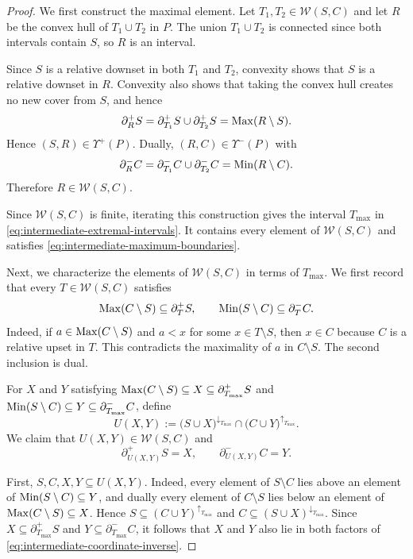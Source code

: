\begin{proof}
We first construct the maximal element.  Let
$T_1,T_2\in\mathcal W(S,C)$ and let $R$ be the convex hull of
$T_1\cup T_2$ in $P$.
The union $T_1\cup T_2$ is connected since both intervals contain
$S$, so $R$ is an interval.

Since $S$ is a relative downset in both $T_1$ and $T_2$, convexity
shows that $S$ is a relative downset in $R$.  Convexity also shows
that taking the convex hull creates no new cover from $S$, and hence
\[
\partial_R^+S
=
\partial_{T_1}^+S\cup\partial_{T_2}^+S
=
\operatorname{Max}(R\setminus S).
\]
Hence $(S,R)\in\Upsilon^+(P)$.
Dually, $(R,C)\in\Upsilon^-(P)$ with
\[
\partial_R^-C
=
\partial_{T_1}^-C\cup\partial_{T_2}^-C
=
\operatorname{Min}(R\setminus C).
\]
Therefore $R\in\mathcal W(S,C)$.

Since $\mathcal W(S,C)$ is finite, iterating this construction gives
the interval $T_{\max}$ in
\eqref{eq:intermediate-extremal-intervals}.  It contains every element
of $\mathcal W(S,C)$ and satisfies
\eqref{eq:intermediate-maximum-boundaries}.

Next, we characterize the elements of $\mathcal W(S,C)$ in terms of
$T_{\max}$.  We first record that every
$T\in\mathcal W(S,C)$ satisfies
\begin{equation}
\label{eq:intermediate-mandatory-boundaries}
\operatorname{Max}(C\setminus S)
\subseteq
\partial_T^+S,
\qquad
\operatorname{Min}(S\setminus C)
\subseteq
\partial_T^-C.
\end{equation}
Indeed, if $a\in\operatorname{Max}(C\setminus S)$ and $a<x$ for some
$x\in T\setminus S$, then $x\in C$ because $C$ is a relative upset
in $T$.  This contradicts the maximality of $a$ in $C\setminus S$.
The second inclusion is dual.



For $X$ and $Y$ satisfying
$\operatorname{Max}(C\setminus S)
\subseteq X \subseteq
\partial_{T_{\max}}^+S$ and
$\operatorname{Min}(S\setminus C) \subseteq Y \subseteq
\partial_{T_{\max}}^-C$,
define
\begin{equation}
\label{eq:intermediate-coordinate-inverse}
U(X,Y)
:=
\bigl(S\cup X\bigr)^{\downarrow_{T_{\max}}}
\cap
\bigl(C\cup Y\bigr)^{\uparrow_{T_{\max}}}.
\end{equation}
We claim that $U(X,Y)\in\mathcal W(S,C)$ and
\begin{equation}
\label{eq:intermediate-coordinate-boundaries}
\partial_{U(X,Y)}^+S
=
X,
\qquad
\partial_{U(X,Y)}^-C
=
Y.
\end{equation}

First, $S,C,X,Y\subseteq U(X,Y)$.  Indeed, every element of
$S\setminus C$ lies above an element of
$\operatorname{Min}(S\setminus C)\subseteq Y$, and dually every element of
$C\setminus S$ lies below an element of
$\operatorname{Max}(C\setminus S)\subseteq X$.  Hence
$S\subseteq(C\cup Y)^{\uparrow_{T_{\max}}}$ and
$C\subseteq(S\cup X)^{\downarrow_{T_{\max}}}$.
Since $X\subseteq\partial_{T_{\max}}^+S$ and
$Y\subseteq\partial_{T_{\max}}^-C$, it follows that $X$ and $Y$
also lie in both factors of
\eqref{eq:intermediate-coordinate-inverse}.


\end{proof}
